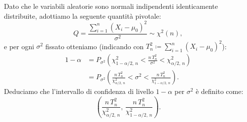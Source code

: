             \begin{prty}[Intervallo bilatero con $\mu = \mu_0,\, \sigma^2 =\,?$]
                Dato che le variabili aleatorie sono normali indipendenti identicamente distribuite, adottiamo 
                la seguente quantità pivotale: \[
                    Q = \frac{\sum_{i=1}^{n} (X_i - \mu_0)^2}{\sigma^2} \sim \chi^2(n)
                ,\] e per ogni $\sigma^2$ fissato otteniamo (indicando con 
                $T_n^2 \coloneqq \sum_{i=1}^{n} (X_i-\mu_0)^2$):
                \begin{align*}
                    1-\alpha &= P_{\sigma^2}\left(\chi^2_{1-\alpha /2,\,n} < \frac{n\,T_n^2}{\sigma^2} 
                    < \chi^2_{\alpha /2,\,n}\right) \\
                    &= P_{\sigma^2}\left(\frac{n\,T_n^2}{\chi^2_{\alpha /2,\,n}} < \sigma^2 
                    < \frac{n\,T_n^2}{\chi^2_{1-\alpha /2,\,n}}\right)
                .\end{align*}
                Deduciamo che l'intervallo di confidenza di livello $1-\alpha$ per $\sigma^2$ è definito come: \[
                    \left(\frac{n\,T_n^2}{\chi^2_{\alpha /2,\,n}},\, 
                    \frac{n\,T_n^2}{\chi^2_{1-\alpha /2,\,n}}\right)
                .\]
            \end{prty}
